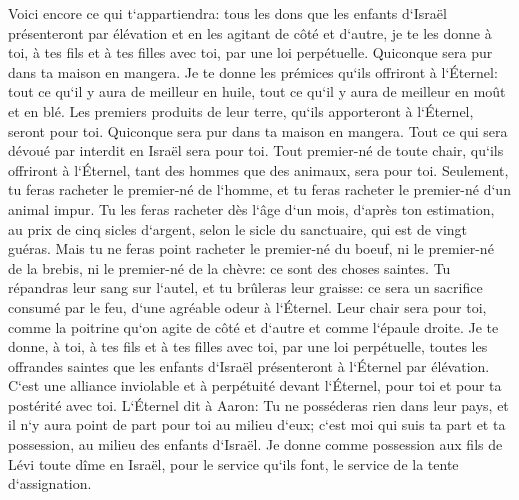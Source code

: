 \verse Voici encore ce qui t`appartiendra: tous les dons que les enfants d`Israël présenteront par élévation et en les agitant de côté et d`autre, je te les donne à toi, à tes fils et à tes filles avec toi, par une loi perpétuelle. Quiconque sera pur dans ta maison en mangera. 
\verse Je te donne les prémices qu`ils offriront à l`Éternel: tout ce qu`il y aura de meilleur en huile, tout ce qu`il y aura de meilleur en moût et en blé. 
\verse Les premiers produits de leur terre, qu`ils apporteront à l`Éternel, seront pour toi. Quiconque sera pur dans ta maison en mangera. 
\verse Tout ce qui sera dévoué par interdit en Israël sera pour toi. 
\verse Tout premier-né de toute chair, qu`ils offriront à l`Éternel, tant des hommes que des animaux, sera pour toi. Seulement, tu feras racheter le premier-né de l`homme, et tu feras racheter le premier-né d`un animal impur. 
\verse Tu les feras racheter dès l`âge d`un mois, d`après ton estimation, au prix de cinq sicles d`argent, selon le sicle du sanctuaire, qui est de vingt guéras. 
\verse Mais tu ne feras point racheter le premier-né du boeuf, ni le premier-né de la brebis, ni le premier-né de la chèvre: ce sont des choses saintes. Tu répandras leur sang sur l`autel, et tu brûleras leur graisse: ce sera un sacrifice consumé par le feu, d`une agréable odeur à l`Éternel. 
\verse Leur chair sera pour toi, comme la poitrine qu`on agite de côté et d`autre et comme l`épaule droite. 
\verse Je te donne, à toi, à tes fils et à tes filles avec toi, par une loi perpétuelle, toutes les offrandes saintes que les enfants d`Israël présenteront à l`Éternel par élévation. C`est une alliance inviolable et à perpétuité devant l`Éternel, pour toi et pour ta postérité avec toi. 
\verse L`Éternel dit à Aaron: Tu ne posséderas rien dans leur pays, et il n`y aura point de part pour toi au milieu d`eux; c`est moi qui suis ta part et ta possession, au milieu des enfants d`Israël. 
\verse Je donne comme possession aux fils de Lévi toute dîme en Israël, pour le service qu`ils font, le service de la tente d`assignation. 
